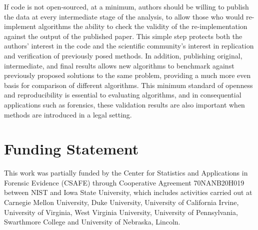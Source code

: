 If code is not open-sourced, at a minimum, authors should be willing to
publish the data at every intermediate stage of the analysis, to allow
those who would re-implement algorithms the ability to check the
validity of the re-implementation against the output of the published
paper. This simple step protects both the authors' interest in the code
and the scientific community's interest in replication and verification
of previously posed methods. In addition, publishing original,
intermediate, and final results allows new algorithms to benchmark
against previously proposed solutions to the same problem, providing a
much more even basis for comparison of different algorithms. This
minimum standard of openness and reproducibility is essential to
evaluating algorithms, and in consequential applications such as
forensics, these validation results are also important when methods are
introduced in a legal setting.

\hypertarget{funding-statement}{%
\section{Funding Statement}\label{funding-statement}}

This work was partially funded by the Center for Statistics and
Applications in Forensic Evidence (CSAFE) through Cooperative Agreement
70NANB20H019 between NIST and Iowa State University, which includes
activities carried out at Carnegie Mellon University, Duke University,
University of California Irvine, University of Virginia, West Virginia
University, University of Pennsylvania, Swarthmore College and
University of Nebraska, Lincoln.




\address{%
Joseph Zemmels\\
Iowa State University\\%
2438 Osborn Dr\\ Ames, IA 50011\\
%
%
%
\\\href{mailto:jzemmels@iastate.edu}{\nolinkurl{jzemmels@iastate.edu}}
}

\address{%
Susan VanderPlas\\
University of Nebraska - Lincoln\\%
340 Hardin Hall North Wing\\ Lincoln, NE 68583\\
%
%
%
\\\href{mailto:susan.vanderplas@unl.edu}{\nolinkurl{susan.vanderplas@unl.edu}}
}

\address{%
Heike Hofmann\\
Iowa State University\\%
2438 Osborn Dr\\ Ames, IA 50011\\
%
%
%
\\\href{mailto:hofmann@iastate.edu}{\nolinkurl{hofmann@iastate.edu}}
}
